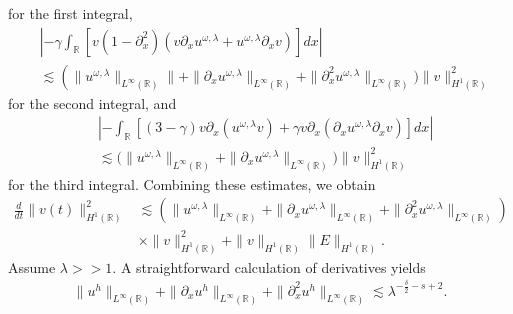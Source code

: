 \documentclass{beamer}
\newcommand{\rr}{\mathbb{R}}
\newcommand{\p}{\partial}
\begin{document}
\begin{frame}
for the first integral,
%
%
\pause
\begin{equation*}
	\begin{split}
\label{applesecond-piece-final}
& \left | -\gamma \int_{\rr}
\left[ v\left( 1-\p_x^2 \right)\left( v \p_x u^{\omega,\lambda} + 
u^{\omega,\lambda} \p_x v
\right) \right] dx \right |
\\
& \lesssim \left( \|u^{\omega,\lambda}\|_{L^\infty(\rr)}\| + \|\p_x 
u^{\omega,\lambda}
\|_{L^\infty(\rr)} \right .  + \|\p_x^2 u^{\omega,\lambda} 
\|_{L^\infty(\rr)}
\big )\|v\|_{H^1(\rr)}^2
\end{split}
\end{equation*}
for the second integral, and
%
%
\pause
%
%
\begin{equation*}
	\begin{split}
\label{applelast_piece_final}
& \left | -\int_{\rr} \left[ \left( 3-\gamma \right)v
\p_x \left( u^{\omega,\lambda} v \right) + \gamma
v \p_x \left( \p_x u^{\omega,\lambda} \p_x v \right)\right]dx \right |
\\
& \lesssim \big(
\|u^{\omega,\lambda}\|_{L^\infty(\rr)}
+ \|\p_x u^{\omega,\lambda} \|_{L^\infty(\rr)} \big)
\|v\|_{H^1(\rr)}^2
\end{split}
\end{equation*}
%
%
%
for the third integral.
\pause
Combining these estimates, we 
obtain
%
%
\begin{equation*}
\begin{split}
\label{appleenergy-estimate-best}
\frac{d}{dt} \|v(t)\|_{H^1(\rr)}^2
& \lesssim \left( \|u^{\omega,\lambda}\|_{L^\infty(\rr)} + \|
\p_x u^{\omega,\lambda} \|_{L^\infty(\rr)} + \|\p_x^2 u^{\omega,\lambda} 
\|_{L^\infty (\rr)} \right)
\\
& \times \|v\|_{H^1(\rr)}^2 + \|v\|_{H^1(\rr)} \|E\|_{H^1(\rr)}.
\end{split}
\end{equation*}
%
%
Assume $\lambda >>1$. A straightforward calculation of derivatives yields
%
%
\begin{equation*}
\begin{split}
\|u^h\|_{L^\infty(\rr)} + \|\p_x u^h\|_{L^\infty(\rr)} + \|\p_x^2
u^h\|_{L^\infty(\rr)} \lesssim \lambda^{- \frac{\delta}{2} - s +2 }.
\label{apple53}
\end{split}
\end{equation*}
%
%
\end{frame}
%
%
\end{document}
